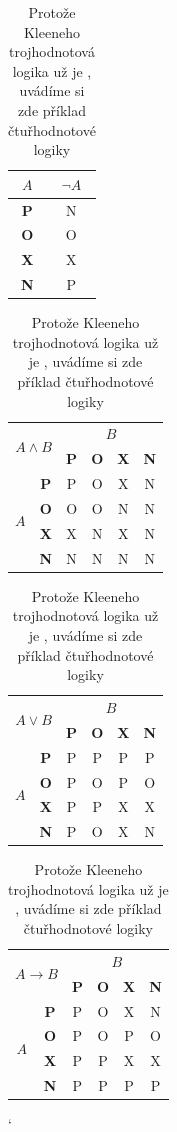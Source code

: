 \documentclass[a4paper,11pt,draft]{article}
\begin{document}
	\begin{table}[h]
	\centering
	\begin{tabular}{|c|c|}
		\hline
		$A$ & $\neg A$\\
		\hline
		\textbf P & N \\
		\textbf O & O \\
		\textbf X & X \\
		\textbf N & P \\
		\hline	
	\end{tabular} 
	\begin{tabular}{|c|c|c|c|c|c|}
		\hline
		\multicolumn{2}{|c|}{\multirow{2}{*}{$A \wedge B$}} & \multicolumn{4}{c|}{$B$}\\
		\cline{3-6}
		\multicolumn{1}{|c}{ } &  & \textbf P & \textbf O & \textbf X & \textbf N \\
		\hline 	
		\multirow{4}{*}{$A$} & \textbf P & P & O & X & N \\
		\cline{2-6}
		& \textbf O & O & O & N & N \\
		\cline{2-6}
		& \textbf X & X & N & X & N \\
		\cline{2-6}
		& \textbf N & N & N & N & N \\
		\hline
	\end{tabular}
	\begin{tabular}{|c|c|c|c|c|c|}
		\hline
		\multicolumn{2}{|c|}{\multirow{2}{*}{$A \vee B$}} & \multicolumn{4}{c|}{$B$}\\
		\cline{3-6}
		\multicolumn{1}{|c}{ } &  & \textbf P & \textbf O & \textbf X & \textbf N \\
		\hline 	
		\multirow{4}{*}{$A$} & \textbf P & P & P & P & P \\
		\cline{2-6}
		& \textbf O & P & O & P & O \\
		\cline{2-6}
		& \textbf X & P & P & X & X \\
		\cline{2-6}
		& \textbf N & P & O & X & N \\
		\hline
	\end{tabular}
	\begin{tabular}{|c|c|c|c|c|c|}
		\hline
		\multicolumn{2}{|c|}{\multirow{2}{*}{$A \rightarrow B$}} & \multicolumn{4}{c|}{$B$}\\
		\cline{3-6}
		\multicolumn{1}{|c}{ } &  & \textbf P & \textbf O & \textbf X & \textbf N \\
		\hline 	
		\multirow{4}{*}{$A$} & \textbf P & P & O & X & N \\
		\cline{2-6}
		& \textbf O & P & O & P & O \\
		\cline{2-6}
		& \textbf X & P & P & X & X \\
		\cline{2-6}
		& \textbf N & P & P & P & P \\
		\hline
\end{tabular}
	\caption{Protože Kleeneho trojhodnotová logika už je , uvádíme si zde příklad čtuřhodnotové logiky}
	\label{logic}
\end{table}
\catcode` 	
\end{document}
